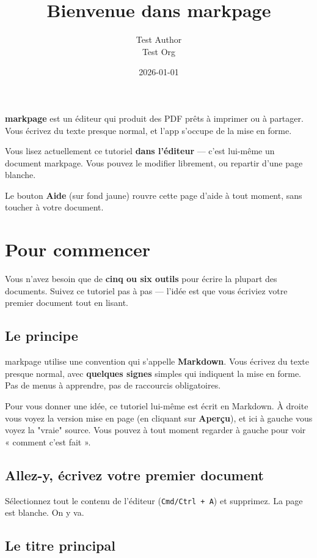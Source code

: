 \documentclass[11pt,a4paper]{article}
\title{Bienvenue dans markpage}
\author{Test Author \\ Test Org}
\date{2026-01-01}
\theoremstyle{definition}
\begin{document}
\maketitle

\textbf{markpage} est un éditeur qui produit des PDF prêts à imprimer ou à
partager. Vous écrivez du texte presque normal, et l'app s'occupe de
la mise en forme.


Vous lisez actuellement ce tutoriel \textbf{dans l'éditeur} — c'est
lui-même un document markpage. Vous pouvez le modifier librement, ou
repartir d'une page blanche.


Le bouton \textbf{Aide} (sur fond jaune) rouvre cette page d'aide à tout
moment, sans toucher à votre document.


\section{Pour commencer}

Vous n'avez besoin que de \textbf{cinq ou six outils} pour écrire la
plupart des documents. Suivez ce tutoriel pas à pas — l'idée est que
vous écriviez votre premier document tout en lisant.


\subsection{Le principe}

markpage utilise une convention qui s'appelle \textbf{Markdown}. Vous écrivez
du texte presque normal, avec \textbf{quelques signes} simples qui indiquent
la mise en forme. Pas de menus à apprendre, pas de raccourcis
obligatoires.


Pour vous donner une idée, ce tutoriel lui-même est écrit en Markdown.
À droite vous voyez la version mise en page (en cliquant sur \textbf{Aperçu}),
et ici à gauche vous voyez la "vraie" source. Vous pouvez à tout
moment regarder à gauche pour voir « comment c'est fait ».


\subsection{Allez-y, écrivez votre premier document}

Sélectionnez tout le contenu de l'éditeur (\texttt{Cmd/Ctrl + A}) et
supprimez. La page est blanche. On y va.


\subsection{Le titre principal}
\end{document}
